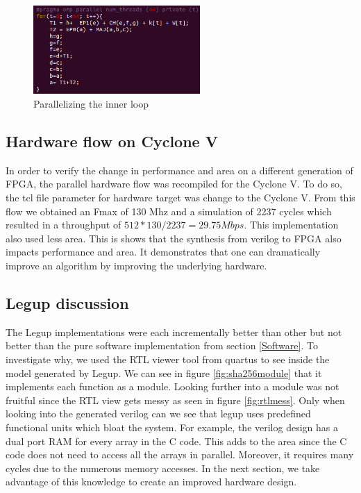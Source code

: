 \documentclass[conference]{IEEEtran}
\begin{document}
\begin{figure}[!t]
\centering
\includegraphics[width=2.5in]{innerLoopParallel}
\caption{Parallelizing the inner loop}
\label{fig:innerloopparallel}
\end{figure}


\subsection{Hardware flow on Cyclone V}
In order to verify the change in performance and area on a different generation of FPGA, the parallel hardware flow was recompiled for the Cyclone V. To do so, the tcl file parameter for hardware target was change to the Cyclone V. From this flow we obtained an Fmax of 130 Mhz and a simulation of 2237 cycles which resulted in a throughput of $512*130/2237=29.75Mbps$. This implementation also used less area. This is shows that the synthesis from verilog to FPGA also impacts performance and area. It demonstrates that one can dramatically improve an algorithm by improving the underlying hardware.

\subsection{Legup discussion}
The Legup implementations were each incrementally better than other but not better than the pure software implementation from section \ref{Software}. To investigate why, we used the RTL viewer tool from quartus to see inside the model generated by Legup. We can see  in figure \ref{fig:sha256module} that it implements each function as a module. Looking further into a module was not fruitful since the RTL view gets messy as seen in figure \ref{fig:rtlmess}. Only when looking into the generated verilog can we see that legup uses predefined functional units which bloat the system. For example, the verilog design has a dual port RAM for every array in the C code. This adds  to the area since the C code does not need to access all the arrays in parallel. Moreover, it requires many cycles due to the numerous memory accesses. In the next section, we take advantage of this  knowledge to create an improved hardware design.
\end{document}

